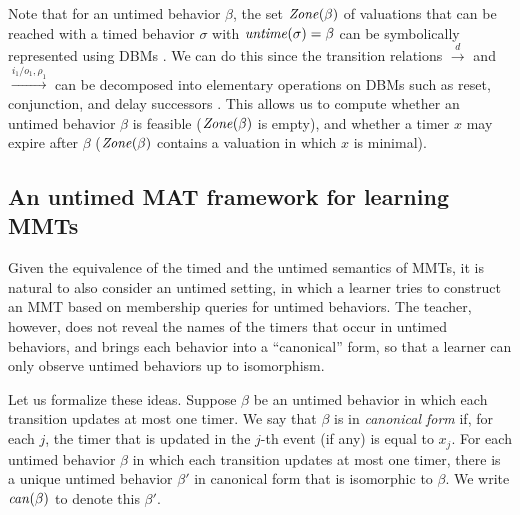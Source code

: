 \ifshort
Note that for an untimed behavior $\beta$, the set $\mathit{Zone}({\beta})$ of valuations that can be reached with a timed behavior $\sigma$ with $\mathit{untime}(\sigma) = \beta$ can be symbolically represented using DBMs \cite{Di89}.
We can do this since the transition relations $\xrightarrow{d}$ and $\xrightarrow{i_1/o_1, \rho_1}$ can be decomposed 
into elementary operations on DBMs such as reset, conjunction, and delay successors \cite{BengtssonY03}.
This allows us to compute whether an untimed behavior $\beta$ is feasible ($\mathit{Zone}({\beta})$ is empty), and
whether a timer $x$ may expire after $\beta$ ($\mathit{Zone}({\beta})$ contains a valuation in which $x$ is minimal).
\fi

\subsection{An untimed MAT framework for learning MMTs}
Given the equivalence of the timed and the untimed semantics of MMTs, it is natural to also 
consider an untimed setting, in which a learner tries to construct an MMT based on membership queries for untimed behaviors.
The teacher, however, does not reveal the names of the timers that occur in untimed behaviors, and brings each behavior into a
``canonical'' form, so that a learner can only observe untimed behaviors up to isomorphism.

Let us formalize these ideas.
Suppose $\beta$ be an untimed behavior in which each transition updates at most one timer.
We say that $\beta$ is in \emph{canonical form} if, for each $j$, the timer that is updated in the $j$-th event
(if any) is equal to $x_j$.
For each untimed behavior $\beta$ in which each transition updates at most one timer, there is a unique untimed behavior
$\beta'$ in canonical form that is isomorphic to $\beta$.
We write $\mathit{can}({\beta})$ to denote this $\beta'$.

